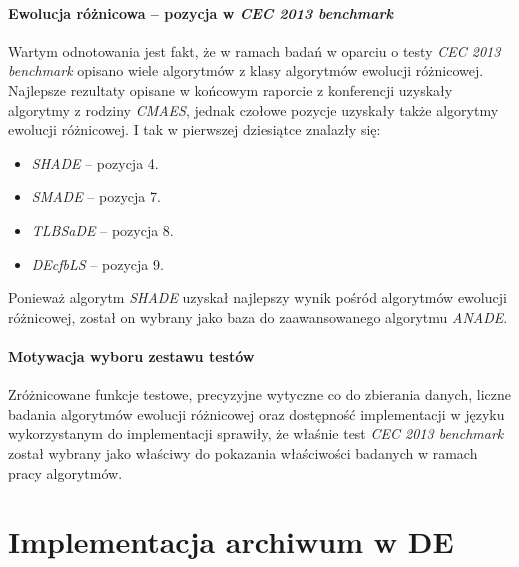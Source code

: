 \documentclass[12pt,a4paper]{report}
\begin{document}
{{{{{{\subsubsection{Ewolucja różnicowa -- pozycja w \emph{CEC 2013 benchmark}}
\par{
Wartym odnotowania jest fakt, że w ramach badań w oparciu o testy \emph{CEC 2013 benchmark} opisano wiele algorytmów z klasy algorytmów ewolucji różnicowej. Najlepsze rezultaty opisane w końcowym raporcie z konferencji \cite{CEC2013Comp} uzyskały algorytmy z rodziny \emph{CMAES}, jednak czołowe pozycje uzyskały także algorytmy ewolucji różnicowej. I tak w pierwszej dziesiątce znalazły się:
\begin{itemize}
\item \emph{SHADE} \cite{SHADE} -- pozycja 4.
\item \emph{SMADE} \cite{SMADE} -- pozycja 7.
\item \emph{TLBSaDE} \cite{TLBSaDE} -- pozycja 8.
\item \emph{DEcfbLS} \cite{DEcfbLS} -- pozycja 9.
\end{itemize}
}
\par{
Ponieważ algorytm \emph{SHADE} uzyskał najlepszy wynik pośród algorytmów ewolucji różnicowej, został on wybrany jako baza do zaawansowanego algorytmu \emph{ANADE}.
}

\subsubsection{Motywacja wyboru zestawu testów}
\par{
Zróżnicowane funkcje testowe, precyzyjne wytyczne co do zbierania danych, liczne badania algorytmów ewolucji różnicowej oraz dostępność implementacji w języku wykorzystanym do implementacji sprawiły, że właśnie test \emph{CEC 2013 benchmark} został wybrany jako właściwy do pokazania właściwości badanych w ramach pracy algorytmów.
}

\chapter{Implementacja archiwum w DE}
}}}}}}
\end{document}

